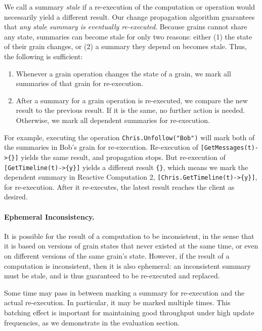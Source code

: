 We call a summary \emph{stale} if a re-execution of the computation or operation would necessarily yield a different result. Our change propagation algorithm guarantees that \emph{any stale summary is eventually re-executed}. Because grains cannot share any state, summaries can become stale for only two reasons: either (1) the state of their grain changes, or (2) a summary they depend on becomes stale. Thus, the following is sufficient:
\begin{enumerate}
\item Whenever a grain operation changes the state of a grain, we mark all summaries of that grain for re-execution.
\item After a summary for a grain operation is re-executed, we compare the new result to the previous result. If it is the same, no further action is needed. Otherwise, we mark all dependent summaries for re-execution.
\end{enumerate}
 
\noindent For example, executing the operation \lstinline|Chris.Unfollow("Bob")| will mark both of the summaries in Bob's grain for re-execution. Re-execution of \lstinline|[GetMessages(t)->{}]| yields the same result, and propagation stops. But re-execution of \lstinline|[GetTimeline(t)->{y}]| yields a different result \lstinline|{}|, which means we mark the dependent summary in Reactive Computation 2, \lstinline|[Chris.GetTimeline(t)->{y}]|, for re-execution. After it re-executes, the latest result reaches the client as desired.

\paragraph{Ephemeral Inconsistency. }  
It is possible for the result of a computation to be inconsistent, in the sense that it is based on versions of grain states that never existed at the same time, or even on different versions of the same grain's state. However, if the result of a computation is inconsistent, then it is also ephemeral: an inconsistent summary must be stale, and is thus guaranteed to be re-executed and replaced.

 Some time may pass in between marking a summary for re-execution and the actual re-execution. In particular, it may be marked multiple times. This batching effect is important for maintaining good throughput under high update frequencies, as we demonstrate in the evaluation section.

